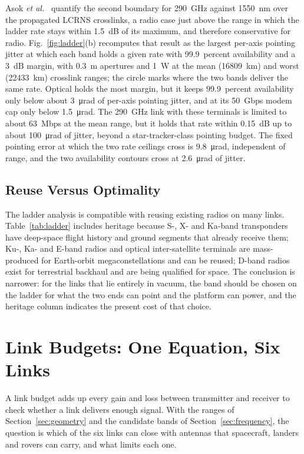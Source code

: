 \documentclass{IEEEoj}
\begin{document}
Asok \emph{et al.}~\cite{asok2027space} quantify the second boundary for \SI{290}{GHz} against \SI{1550}{nm} over the propagated LCRNS crosslinks, a radio case just above the range in which the ladder rate stays within \SI{1.5}{dB} of its maximum, and therefore conservative for radio. Fig.~\ref{fig:ladder}(b) recomputes that result as the largest per-axis pointing jitter at which each band holds a given rate with 99.9~percent availability and a \SI{3}{dB} margin, with \SI{0.3}{m} apertures and \SI{1}{W} at the mean (\SI{16809}{km}) and worst (\SI{22433}{km}) crosslink ranges; the circle marks where the two bands deliver the same rate. Optical holds the most margin, but it keeps 99.9~percent availability only below about \SI{3}{\micro\radian} of per-axis pointing jitter, and at its \SI{50}{Gbps} modem cap only below \SI{1.5}{\micro\radian}. The \SI{290}{GHz} link with these terminals is limited to about \SI{63}{Mbps} at the mean range, but it holds that rate within \SI{0.15}{dB} up to about \SI{100}{\micro\radian} of jitter, beyond a star-tracker-class pointing budget. The fixed pointing error at which the two rate ceilings cross is \SI{9.8}{\micro\radian}, independent of range, and the two availability contours cross at \SI{2.6}{\micro\radian} of jitter.

\subsection{Reuse Versus Optimality}
The ladder analysis is compatible with reusing existing radios on many links. Table~\ref{tab:ladder} includes heritage because S-, X- and Ka-band transponders have deep-space flight history and ground segments that already receive them; Ku-, Ka- and E-band radios and optical inter-satellite terminals are mass-produced for Earth-orbit megaconstellations and can be reused; D-band radios exist for terrestrial backhaul and are being qualified for space. The conclusion is narrower: for the links that lie entirely in vacuum, the band should be chosen on the ladder for what the two ends can point and the platform can power, and the heritage column indicates the present cost of that choice.


\section{Link Budgets: One Equation, Six Links}
\label{sec:budgets}
A link budget adds up every gain and loss between transmitter and receiver to check whether a link delivers enough signal. With the ranges of Section~\ref{sec:geometry} and the candidate bands of Section~\ref{sec:frequency}, the question is which of the six links can close with antennas that spacecraft, landers and rovers can carry, and what limits each one.
\end{document}
